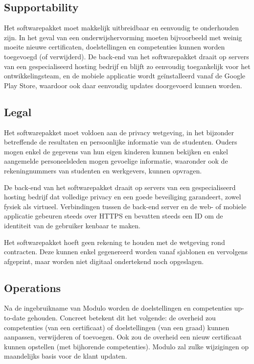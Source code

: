 \documentclass[a4paper]{article}
\begin{document}
\subsection{Supportability}
Het softwarepakket moet makkelijk uitbreidbaar en eenvoudig te onderhouden zijn. In het geval van een onderwijshervorming moeten bijvoorbeeld met weinig moeite nieuwe certificaten, doelstellingen en competenties kunnen worden toegevoegd (of verwijderd). De back-end van het softwarepakket draait op servers van een gespecialiseerd hosting bedrijf en blijft zo eenvoudig toegankelijk voor het ontwikkelingsteam, en de mobiele applicatie wordt geïnstalleerd vanaf de Google Play Store, waardoor ook daar eenvoudig updates doorgevoerd kunnen worden.


\subsection{Legal}
Het softwarepakket moet voldoen aan de privacy wetgeving, in het bijzonder betreffende de resultaten en persoonlijke informatie van de studenten. Ouders mogen enkel de gegevens van hun eigen kinderen kunnen bekijken en enkel aangemelde personeelsleden mogen gevoelige informatie, waaronder ook de rekeningnummers van studenten en werkgevers, kunnen opvragen.

De back-end van het softwarepakket draait op servers van een gespecialiseerd hosting bedrijf dat volledige privacy en een goede beveiliging garandeert, zowel fysiek als virtueel. Verbindingen tussen de back-end server en de web- of mobiele applicatie gebeuren steeds over HTTPS en bevatten steeds een ID om de identiteit van de gebruiker kenbaar te maken.

Het softwarepakket hoeft geen rekening te houden met de wetgeving rond contracten. Deze kunnen enkel gegenereerd worden vanaf sjablonen en vervolgens afgeprint, maar worden niet digitaal ondertekend noch opgeslagen.


\subsection{Operations}
Na de ingebruikname van Modulo worden de doelstellingen en competenties up-to-date gehouden. Concreet betekent dit het volgende: de overheid zou competenties (van een certificaat) of doelstellingen (van een graad) kunnen aanpassen, verwijderen of toevoegen. Ook zou de overheid een nieuw certificaat kunnen opstellen (met bijhorende competenties). Modulo zal zulke wijzigingen op maandelijks basis voor de klant updaten.
\end{document}
